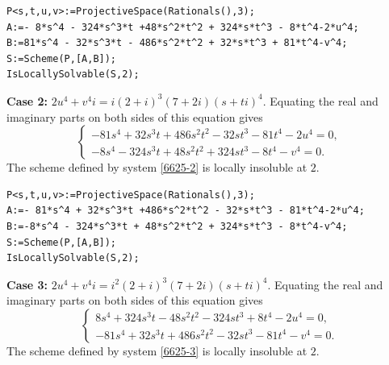\documentclass[a4paper,12pt,english,reqno]{amsart}
\begin{document}
\begin{lstlisting}
P<s,t,u,v>:=ProjectiveSpace(Rationals(),3);
A:=- 8*s^4 - 324*s^3*t +48*s^2*t^2 + 324*s*t^3 - 8*t^4-2*u^4;
B:=81*s^4 - 32*s^3*t - 486*s^2*t^2 + 32*s*t^3 + 81*t^4-v^4;
S:=Scheme(P,[A,B]);
IsLocallySolvable(S,2);
\end{lstlisting}

{\bf Case 2:} $2u^4+v^4i=i(2+i)^3(7+2i)(s+ti)^4$. Equating the real and imaginary parts on both sides of this equation gives
\begin{equation}\label{6625-2}
\begin{cases}
-81s^4 + 32s^3t + 486s^2t^2 - 32st^3 - 81t^4 - 2u^4=0,\\
-8s^4 - 324s^3t + 48s^2t^2 + 324st^3 - 8t^4 - v^4=0.
\end{cases}
\end{equation}
The scheme defined by system \eqref{6625-2} is locally insoluble at $2$.


\begin{lstlisting}
P<s,t,u,v>:=ProjectiveSpace(Rationals(),3);
A:=- 81*s^4 + 32*s^3*t +486*s^2*t^2 - 32*s*t^3 - 81*t^4-2*u^4;
B:=-8*s^4 - 324*s^3*t + 48*s^2*t^2 + 324*s*t^3 - 8*t^4-v^4;
S:=Scheme(P,[A,B]);
IsLocallySolvable(S,2);
\end{lstlisting}
{\bf Case 3:} $2u^4+v^4i=i^2(2+i)^3(7+2i)(s+ti)^4$. Equating the real and imaginary parts on both sides of this equation gives
\begin{equation}\label{6625-3}
\begin{cases}
8s^4 + 324s^3t - 48s^2t^2 - 324st^3 + 8t^4 - 2u^4=0,\\
-81s^4 + 32s^3t + 486s^2t^2 - 32st^3 - 81t^4 - v^4=0.
\end{cases}
\end{equation}
The scheme defined by system \eqref{6625-3} is locally insoluble at $2$.
\end{document}
